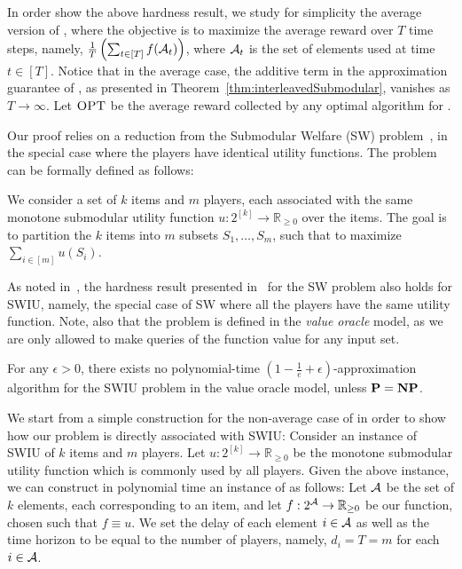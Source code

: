 \restateSubmodularHardness* 

In order show the above hardness result, we study for simplicity the average version of \rsm, where the objective is to maximize the average reward over $T$ time steps, namely, $\frac{1}{T}\left(\sum_{t \in [T]} f(\operatorname{\mathcal{A}}_t)\right)$, where $\operatorname{\mathcal{A}}_t$ is the set of elements used at time $t \in [T]$. Notice that in the average case, the additive term in the approximation guarantee of \ig, as presented in Theorem~\ref{thm:interleavedSubmodular}, vanishes as $T \to \infty$. Let $\textsc{OPT}$ be the average reward collected by any optimal algorithm for \rsm. 

Our proof relies on a reduction from the Submodular Welfare (SW) problem~\cite{Von08}, in the special case where the players have identical utility functions. The problem can be formally defined as follows:

\begin{definition}
We consider a set of $k$ items and $m$ players, each associated with the same monotone submodular utility function $u:2^{[k]} \rightarrow \mathbb{R}_{\geq 0}$ over the items. The goal is to partition the $k$ items into $m$ subsets $S_1,\dots, S_m$, such that to maximize $\sum_{i \in [m]}u(S_i)$.
\end{definition}

As noted in~\cite{Von08}, the hardness result presented in~\cite{KLMM05} for the SW problem also holds for SWIU, namely, the special case of SW where all the players have the same utility function. Note, also that the \rsm problem is defined in the {\em value oracle} model, as we are only allowed to make queries of the function value for any input set.

\begin{theorem}\label{thm:hardness:swiu}
For any $\epsilon > 0$, there exists no polynomial-time $\left(1 - \frac{1}{e} + \epsilon\right)$-approximation algorithm for the SWIU problem in the value oracle model, unless ${\bf P} = {\bf NP}$.
\end{theorem}

We start from a simple construction for the non-average case of \rsm in order to show how our problem is directly associated with SWIU: Consider an instance of SWIU of $k$ items and $m$ players. Let $u:2^{[k]} \rightarrow \mathbb{R}_{\geq 0}$ be the monotone submodular utility function which is commonly used by all players. Given the above instance, we can construct in polynomial time an instance of \rsm as follows: Let $\operatorname{\mathcal{A}}$ be the set of $k$ elements, each corresponding to an item, and let $f:2^{\operatorname{\mathcal{A}}} \rightarrow \mathbb{R}_{\geq 0}$ be our function, chosen such that $f \equiv u$. We set the delay of each element $i \in \operatorname{\mathcal{A}}$ as well as the time horizon to be equal to the number of players, namely, $ d_i = T  = m$ for each $i \in \operatorname{\mathcal{A}}$.

